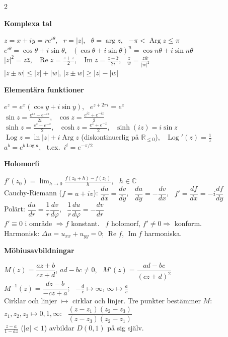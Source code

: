 \small
\setlength{\columnsep}{1.4em}
\setlength{\parskip}{0.35em}
\newcommand{\fsec}[1]{\par\smallskip\noindent\textbf{\color{red!55!black}#1}\par}

\begin{multicols}{2}

\fsec{Komplexa tal}
$z = x + iy = re^{i\theta}$, \ $r = |z|$, \ $\theta = \arg z$, \ $-\pi < \operatorname{Arg} z \le \pi$ \\
$e^{i\theta} = \cos\theta + i\sin\theta$, \ $(\cos\theta + i\sin\theta)^n = \cos n\theta + i\sin n\theta$ \\
$|z|^2 = z\bar z$, \ $\operatorname{Re} z = \frac{z + \bar z}{2}$, \ $\operatorname{Im} z = \frac{z - \bar z}{2i}$, \ $\frac{z}{w} = \frac{z\bar w}{|w|^2}$ \\
$|z \pm w| \le |z| + |w|$, \quad $|z \pm w| \ge |z| - |w|$

\fsec{Elementära funktioner}
$e^z = e^x(\cos y + i\sin y)$, \ $e^{z + 2\pi i} = e^z$ \\
$\sin z = \frac{e^{iz} - e^{-iz}}{2i}$, \ $\cos z = \frac{e^{iz} + e^{-iz}}{2}$ \\
$\sinh z = \frac{e^z - e^{-z}}{2}$, \ $\cosh z = \frac{e^z + e^{-z}}{2}$, \ $\sinh(iz) = i\sin z$ \\
$\operatorname{Log} z = \ln|z| + i\operatorname{Arg} z$ (diskontinuerlig på $\mathbb{R}_{\le 0}$), \ $\operatorname{Log}'(z) = \frac1z$ \\
$a^b = e^{b\operatorname{Log} a}$, \ t.ex.\ $i^i = e^{-\pi/2}$

\fsec{Holomorfi}
$f'(z_0) = \displaystyle\lim_{h \to 0} \frac{f(z_0 + h) - f(z_0)}{h}$, \ $h \in \mathbb{C}$ \\
Cauchy-Riemann ($f = u + iv$): $\dfrac{du}{dx} = \dfrac{dv}{dy}$, \ $\dfrac{du}{dy} = -\dfrac{dv}{dx}$, \ $f' = \dfrac{df}{dx} = -i\dfrac{df}{dy}$ \\
Polärt: $\dfrac{du}{dr} = \dfrac1r\dfrac{dv}{d\varphi}$, \ $\dfrac1r\dfrac{du}{d\varphi} = -\dfrac{dv}{dr}$ \\
$f' \equiv 0$ i område $\Rightarrow f$ konstant. \ $f$ holomorf, $f' \neq 0 \Rightarrow$ konform. \\
Harmonisk: $\Delta u = u_{xx} + u_{yy} = 0$; $\operatorname{Re} f$, $\operatorname{Im} f$ harmoniska.

\fsec{Möbiusavbildningar}
$M(z) = \dfrac{az + b}{cz + d}$, $ad - bc \neq 0$, \ $M'(z) = \dfrac{ad - bc}{(cz + d)^2}$ \\
$M^{-1}(z) = \dfrac{dz - b}{-cz + a}$; \ $-\frac dc \mapsto \infty$, $\infty \mapsto \frac ac$ \\
Cirklar och linjer $\mapsto$ cirklar och linjer. Tre punkter bestämmer $M$:
$z_1, z_2, z_3 \mapsto 0, 1, \infty$: \ $\dfrac{(z - z_1)(z_2 - z_3)}{(z - z_3)(z_2 - z_1)}$ \\
$\frac{z - a}{1 - \bar a z}$ ($|a| < 1$) avbildar $D(0,1)$ på sig själv.


\end{multicols}
